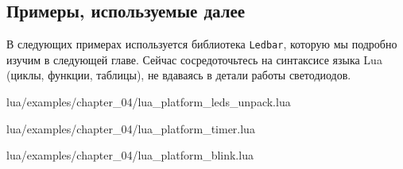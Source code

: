 \subsection{Примеры, используемые далее}
\begin{infobox}
    В следующих примерах используется библиотека \texttt{Ledbar}, которую мы подробно изучим в следующей главе. Сейчас сосредоточьтесь на синтаксисе языка Lua (циклы, функции, таблицы), не вдаваясь в детали работы светодиодов.
\end{infobox}
\begin{codefile}{lua/examples/chapter_04/lua_platform_leds_unpack.lua}
\end{codefile}
\begin{codefile}{lua/examples/chapter_04/lua_platform_timer.lua}
\end{codefile}
\begin{codefile}{lua/examples/chapter_04/lua_platform_blink.lua}
\end{codefile}
